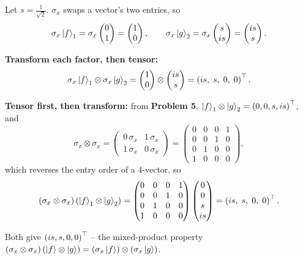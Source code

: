 \documentclass[a4paper, 10pt]{article}
\begin{document}
\begin{solution}
	\noindent Let \( s = \tfrac{1}{\sqrt{2}} \). \( \sigma_x \) swaps a vector's two entries, so
	\[
		\sigma_x\ket{f}_1 = \sigma_x \begin{pmatrix} 0 \\ 1 \end{pmatrix} = \begin{pmatrix} 1 \\ 0 \end{pmatrix},
		\qquad
		\sigma_x\ket{g}_2 = \sigma_x \begin{pmatrix} s \\ is \end{pmatrix} = \begin{pmatrix} is \\ s \end{pmatrix}.
	\]

	\noindent \textbf{Transform each factor, then tensor:}
	\[
		\sigma_x\ket{f}_1 \otimes \sigma_x\ket{g}_2
		= \begin{pmatrix} 1 \\ 0 \end{pmatrix} \otimes \begin{pmatrix} is \\ s \end{pmatrix}
		= \left(is,\; s,\; 0,\; 0\right)^{\top}.
	\]

	\noindent \textbf{Tensor first, then transform:} from \textbf{Problem 5}, \( \ket{f}_1 \otimes \ket{g}_2 = \left(0, 0, s, is\right)^{\top} \), and
	\[
		\sigma_x \otimes \sigma_x
		= \begin{pmatrix} 0\,\sigma_x & 1\,\sigma_x \\ 1\,\sigma_x & 0\,\sigma_x \end{pmatrix}
		= \begin{pmatrix}
			0 & 0 & 0 & 1 \\
			0 & 0 & 1 & 0 \\
			0 & 1 & 0 & 0 \\
			1 & 0 & 0 & 0
		\end{pmatrix},
	\]
	which reverses the entry order of a \( 4 \)-vector, so
	\[
		\left(\sigma_x \otimes \sigma_x\right)\left(\ket{f}_1 \otimes \ket{g}_2\right)
		= \begin{pmatrix}
			0 & 0 & 0 & 1 \\ 0 & 0 & 1 & 0 \\ 0 & 1 & 0 & 0 \\ 1 & 0 & 0 & 0
		\end{pmatrix}
		\begin{pmatrix} 0 \\ 0 \\ s \\ is \end{pmatrix}
		= \left(is,\; s,\; 0,\; 0\right)^{\top}.
	\]

	\noindent Both give \( \left(is, s, 0, 0\right)^{\top} \) -- the mixed-product property
	\( \left(\sigma_x \otimes \sigma_x\right)\left(\ket{f} \otimes \ket{g}\right) = \left(\sigma_x\ket{f}\right) \otimes \left(\sigma_x\ket{g}\right) \).
\end{solution}
\end{document}
